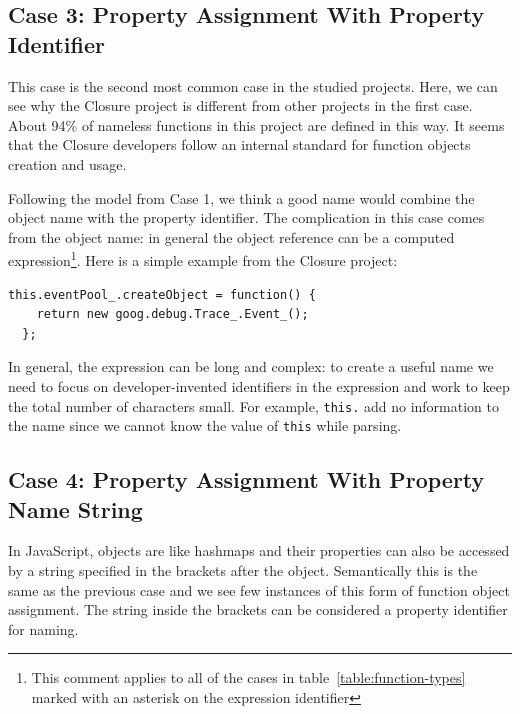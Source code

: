 \documentclass[10pt, preprint]{sigplanconf}
\begin{document}
\subsection{Case 3: Property Assignment With Property Identifier}
\label{sec:propid}
This case is the second most common case in the studied projects. Here, we can see why the Closure project is different from other projects in the first case. About 94\% of nameless functions in this project are defined in this way. It seems that the Closure developers follow an internal standard for function objects creation and usage.  

Following the model from Case 1, we think a good name would combine the object name with the property identifier. The complication in this case comes from the object name: in general the object reference can be a computed expression\footnote[4]{This comment applies to all of the cases in table~\ref{table:function-types} marked with an asterisk on the expression identifier}. Here is a simple example from the Closure project: 
\lstset{basicstyle=\scriptsize}
\begin{lstlisting}[frame=single, language=myLang]
  this.eventPool_.createObject = function() {
    return new goog.debug.Trace_.Event_();
  };
\end{lstlisting}

In general, the expression can be long and complex: to create a useful name we need to focus on developer-invented identifiers in the expression and work to keep the total number of characters small. For example, \verb|this.| add no information to the name since we cannot know the value of \verb|this| while parsing. 

\subsection{Case 4: Property Assignment With  Property Name String}
In JavaScript, objects are like hashmaps and their properties can also be accessed by a string  specified in the brackets after the object. Semantically this is the same as the previous case and we see few instances of this form of function object assignment. The string inside the brackets can be considered a property identifier for naming.
\end{document}
